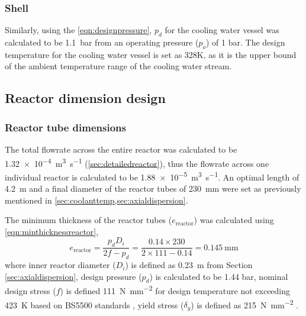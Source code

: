 \subsubsection{Shell}
Similarly, using the \cref{eqn:designpressure}, $p_d$ for the cooling water vessel was calculated to be \SI{1.1}{\bar} from an operating pressure ($p_o$) of 1 bar. The design temperature for the cooling water vessel is set as 328K, as it is the upper bound of the ambient temperature range of the cooling water stream. 

\subsection{Reactor dimension design}
\label{sec:reactordimensions}

\subsubsection{Reactor tube dimensions}
\label{sec:reactortube}
The total flowrate across the entire reactor was calculated to be \SI{1.32e-4}{\cubic\m\per\s} (\cref{sec:detailedreactor}), thus the flowrate across one individual reactor is calculated to be  \SI{1.88e-5}{\cubic\m\per\s}. An optimal length of \SI{4.2}{\metre} and a final diameter of the reactor tubes of \SI{230}{\milli \metre} were set as previously mentioned in \cref{sec:coolanttemp,sec:axialdispersion}. 

The minimum thickness of the reactor tubes ($e_\mathrm{reactor}$) was calculated using \cref{eqn:minthicknessreactor},
\begin{equation}
    e_\mathrm{reactor} = \frac{p_dD_i}{2f-p_d} = \frac{0.14 \times 230}{2 \times 111 - 0.14} = \SI{0.145}{\mm}
    \label{eqn:minthicknessreactor}
\end{equation}
where inner reactor diameter ($D_i$) is defined as \SI{0.23}{\metre} from Section \ref{sec:axialdispersion}, design pressure ($p_d$) is calculated to be 1.44 bar, nominal design stress ($f$) is defined \SI{111}{\N\per\square\mm} for design temperature not exceeding \SI{423}{\K} based on BS5500 standards , yield stress ($\delta_y$) is defined as \SI{215}{\N\per\square\mm} \cite{noauthor_unfired_nodate}.


